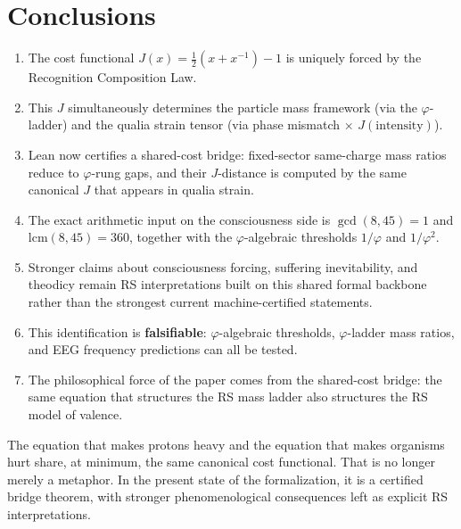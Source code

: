 \documentclass[11pt,a4paper]{article}
\theoremstyle{plain}
\theoremstyle{definition}
\theoremstyle{remark}
\newcommand{\Jcost}{J}
\newcommand{\vp}{\varphi}
\begin{document}
\section{Conclusions}
\label{sec:conclusions}

\begin{enumerate}[nosep]
\item The cost functional $\Jcost(x) = \tfrac{1}{2}(x + x^{-1}) - 1$
      is uniquely forced by the Recognition Composition Law.

\item This $\Jcost$ simultaneously determines the particle mass
      framework (via the $\vp$-ladder) and the qualia strain tensor
      (via phase mismatch $\times$ $\Jcost(\text{intensity})$).

\item Lean now certifies a shared-cost bridge: fixed-sector same-charge
      mass ratios reduce to $\vp$-rung gaps, and their $\Jcost$-distance
      is computed by the same canonical $\Jcost$ that appears in qualia
      strain.

\item The exact arithmetic input on the consciousness side is
      $\gcd(8,45)=1$ and $\mathrm{lcm}(8,45)=360$, together with the
      $\vp$-algebraic thresholds $1/\vp$ and $1/\vp^2$.

\item Stronger claims about consciousness forcing, suffering
      inevitability, and theodicy remain RS interpretations built on
      this shared formal backbone rather than the strongest current
      machine-certified statements.

\item This identification is \textbf{falsifiable}: $\vp$-algebraic
      thresholds, $\vp$-ladder mass ratios, and EEG frequency
      predictions can all be tested.

\item The philosophical force of the paper comes from the shared-cost
      bridge: the same equation that structures the RS mass ladder also
      structures the RS model of valence.
\end{enumerate}

The equation that makes protons heavy and the equation that makes
organisms hurt share, at minimum, the same canonical cost functional.
That is no longer merely a metaphor.  In the present state of the
formalization, it is a certified bridge theorem, with stronger
phenomenological consequences left as explicit RS interpretations.
\end{document}
